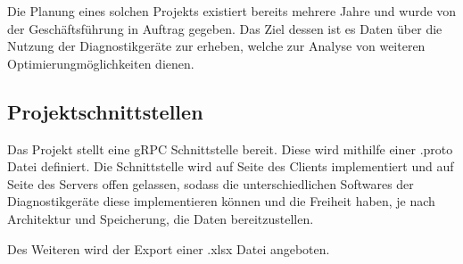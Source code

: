 Die Planung eines solchen Projekts existiert bereits mehrere Jahre und wurde von der Geschäftsführung in Auftrag gegeben. Das Ziel dessen ist es Daten über die Nutzung der {\betriebNameKzf} Diagnostikgeräte zur erheben, welche zur Analyse von weiteren Optimierungmöglichkeiten dienen.

\subsection{Projektschnittstellen}
\label{sec:Projektschnittstellen}
Das Projekt stellt eine {\acs{gRPC}} Schnittstelle bereit. Diese wird mithilfe einer \glqq .proto\grqq \xspace Datei definiert. Die Schnittstelle wird auf Seite des Clients implementiert und auf Seite des Servers offen gelassen, sodass die unterschiedlichen Softwares der Diagnostikgeräte diese implementieren können und die Freiheit haben, je nach Architektur und Speicherung, die Daten bereitzustellen.

Des Weiteren wird der Export einer \glqq .xlsx\grqq \xspace Datei angeboten.